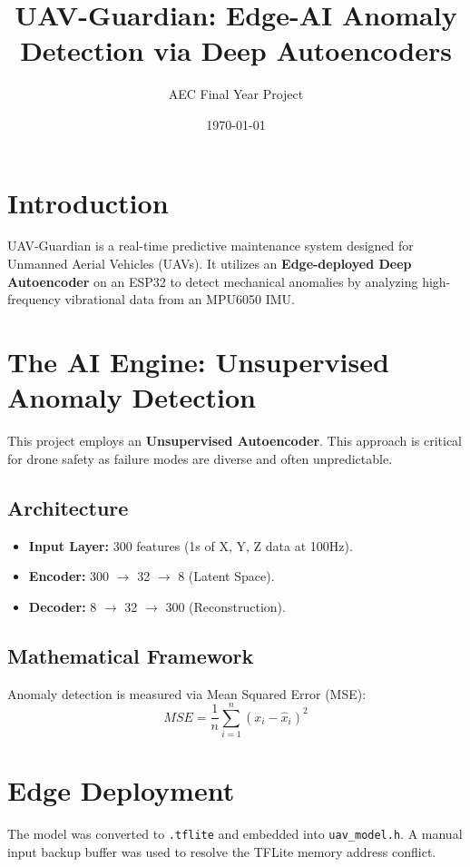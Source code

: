 \documentclass[11pt,a4paper]{article}
\title{\textbf{UAV-Guardian: Edge-AI Anomaly Detection via Deep Autoencoders}}
\author{AEC Final Year Project}
\date{\today}
\begin{document}
\maketitle

\section{Introduction}
UAV-Guardian is a real-time predictive maintenance system designed for Unmanned Aerial Vehicles (UAVs). It utilizes an \textbf{Edge-deployed Deep Autoencoder} on an ESP32 to detect mechanical anomalies by analyzing high-frequency vibrational data from an MPU6050 IMU.

\section{The AI Engine: Unsupervised Anomaly Detection}
This project employs an \textbf{Unsupervised Autoencoder}. This approach is critical for drone safety as failure modes are diverse and often unpredictable.

\subsection{Architecture}
\begin{itemize}
    \item \textbf{Input Layer:} 300 features (1s of X, Y, Z data at 100Hz).
    \item \textbf{Encoder:} 300 $\rightarrow$ 32 $\rightarrow$ 8 (Latent Space).
    \item \textbf{Decoder:} 8 $\rightarrow$ 32 $\rightarrow$ 300 (Reconstruction).
\end{itemize}

\subsection{Mathematical Framework}
Anomaly detection is measured via Mean Squared Error (MSE):
\begin{equation}
MSE = \frac{1}{n} \sum_{i=1}^{n} (x_i - \hat{x}_i)^2
\end{equation}

\section{Edge Deployment}
The model was converted to \texttt{.tflite} and embedded into \texttt{uav_model.h}. A manual input backup buffer was used to resolve the TFLite memory address conflict.
\end{document}
